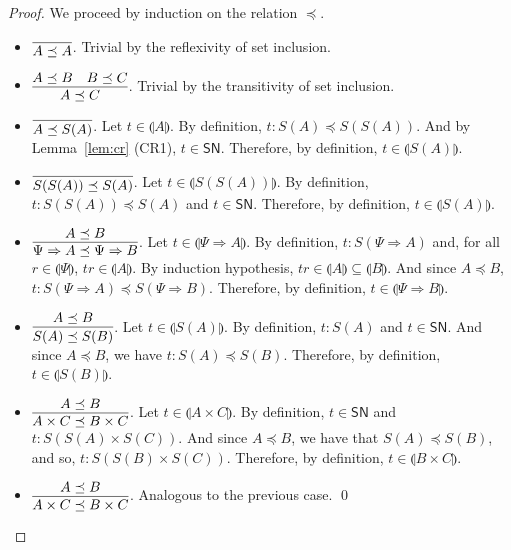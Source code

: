 \documentclass[preprint]{elsarticle}
\newcommand\interp[1]{\llparenthesis #1\rrparenthesis}
\newcommand\SN{\mathsf{SN}}
\newcommand{\app}[2]{#1 #2}
\begin{document}
\begin{proof}
  We proceed by induction on the relation $\preceq$.
  \begin{itemize}
  \item \( \vcenter{\infer{A \preceq A}{}} \). Trivial by the reflexivity of set inclusion.
  \item \( \vcenter{\infer{A \preceq C}{A \preceq B & B \preceq C}} \). Trivial by the transitivity of set inclusion.
  \item \( \vcenter{\infer{A \preceq S(A)}{}} \). Let \( t \in \interp{A} \). By definition, \( t : S(A) \preceq S(S(A)) \). And by Lemma~\ref{lem:cr} (CR1), \( t \in \SN \). Therefore, by definition, \( t \in \interp{S(A)} \).
  \item \( \vcenter{\infer{S(S(A)) \preceq S(A)}{}} \).
    Let \( t \in \interp{S(S(A))}\). By definition, \( t : S(S(A)) \preceq S(A) \) and \( t \in \SN \). Therefore, by definition, \( t \in \interp{S(A)} \).
  \item \( \vcenter{\infer{\Psi \Rightarrow A \preceq \Psi \Rightarrow B}{A
        \preceq B}} \).
    Let \( t\in\interp{\Psi\Rightarrow A} \). By definition, \( t : S(\Psi \Rightarrow A) \) and, for all \( r \in \interp{\Psi} \), \( \app{t}{r} \in \interp{A} \). By induction hypothesis, \( \app{t}{r} \in \interp{A} \subseteq \interp{B} \). And since \( A \preceq B \), \( t : S(\Psi \Rightarrow A) \preceq S(\Psi \Rightarrow B) \). Therefore, by definition, \( t \in \interp{\Psi \Rightarrow B} \).
  \item \( \vcenter{\infer{S(A) \preceq S(B)}{A \preceq B}} \). Let \( t \in \interp{S(A)} \). By definition, \( t : S(A) \) and \( t \in \SN \). And since \( A \preceq B \), we have \( t : S(A) \preceq S(B) \). Therefore, by definition, \( t \in \interp{S(B)} \).
  \item \( \vcenter{\infer{A \times C \preceq B \times C}{A \preceq B}} \). Let \( t \in \interp{A \times C} \). By definition, \( t \in \SN \) and \( t : S(S(A) \times S(C)) \). And since \( A \preceq B \), we have that \( S(A) \preceq S(B) \), and so, \( t : S(S(B) \times S(C)) \). Therefore, by definition, \( t \in \interp{B \times C} \).
  \item \( \vcenter{\infer{A \times C \preceq B \times C}{A \preceq B}} \). Analogous to the previous case.
  \qed
  \end{itemize}
\end{proof}
\end{document}
